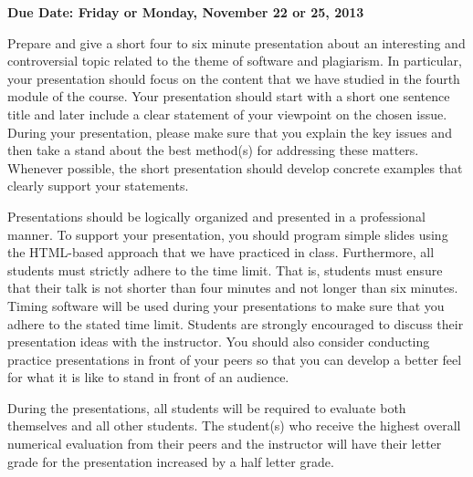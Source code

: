 

\usepackage[compact]{titlesec}



\vspace*{-.2in}
\begin{center}
	{\bf Due Date: Friday or Monday, November 22 or 25, 2013}
\end{center}

Prepare and give a short four to six minute presentation about an interesting and controversial topic related to the
theme of software and plagiarism. In particular, your presentation should focus on the content that we have studied in
the fourth module of the course. Your presentation should start with a short one sentence title and later include a clear
statement of your viewpoint on the chosen issue. During your presentation, please make sure that you explain the key
issues and then take a stand about the best method(s) for addressing these matters. Whenever possible, the short
presentation should develop concrete examples that clearly support your statements.

Presentations should be logically organized and presented in a professional manner. To support your presentation, you
should program simple slides using the HTML-based approach that we have practiced in class. Furthermore, all
students must strictly adhere to the time limit. That is, students must ensure that their talk is not shorter than four
minutes and not longer than six minutes. Timing software will be used during your presentations to make sure that you
adhere to the stated time limit. Students are strongly encouraged to discuss their presentation ideas with the
instructor.  You should also consider conducting practice presentations in front of your peers so that you can develop
a better feel for what it is like to stand in front of an audience.

During the presentations, all students will be required to evaluate both themselves and all other students.  The student(s)
who receive the highest overall numerical evaluation from their peers and the instructor will have their letter grade
for the presentation increased by a half letter grade.



